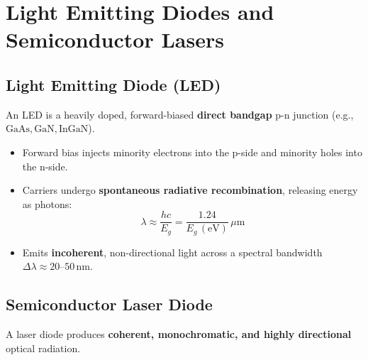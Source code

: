 \documentclass[12pt,a4paper]{article}
\begin{document}
\section{Light Emitting Diodes and Semiconductor Lasers}

\subsection{Light Emitting Diode (LED)}
An LED is a heavily doped, forward-biased \textbf{direct bandgap} p-n junction (e.g., $\text{GaAs}, \text{GaN}, \text{InGaN}$).
\begin{itemize}[leftmargin=*, itemsep=3pt]
  \item Forward bias injects minority electrons into the p-side and minority holes into the n-side.
  \item Carriers undergo \textbf{spontaneous radiative recombination}, releasing energy as photons:
  \begin{equation}
    \lambda \approx \frac{hc}{E_g} = \frac{1.24}{E_g\,(\text{eV})}\,\mu\text{m}
  \end{equation}
  \item Emits \textbf{incoherent}, non-directional light across a spectral bandwidth $\Delta \lambda \approx 20\text{--}50\,\text{nm}$.
\end{itemize}

\subsection{Semiconductor Laser Diode}
A laser diode produces \textbf{coherent, monochromatic, and highly directional} optical radiation.
\end{document}
